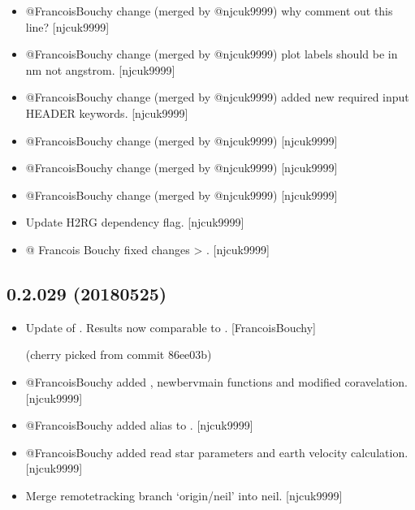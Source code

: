 \documentclass[a4paper,10pt,english]{report}
\begin{document}
\begin{itemize}
\begin{description}
\end{description}

\item {} 
@FrancoisBouchy change (merged by @njcuk9999) \sphinxhyphen{} why comment out this
line? {[}njcuk9999{]}

\item {} 
@FrancoisBouchy change (merged by @njcuk9999) \sphinxhyphen{} plot labels should be
in nm not angstrom. {[}njcuk9999{]}

\item {} 
@FrancoisBouchy change (merged by @njcuk9999) \sphinxhyphen{} added new required
input HEADER keywords. {[}njcuk9999{]}

\item {} 
@FrancoisBouchy change (merged by @njcuk9999) {[}njcuk9999{]}

\item {} 
@FrancoisBouchy change (merged by @njcuk9999) {[}njcuk9999{]}

\item {} 
@FrancoisBouchy change (merged by @njcuk9999) {[}njcuk9999{]}

\item {} 
Update H2RG dependency flag. {[}njcuk9999{]}

\item {} 
@ Francois Bouchy \sphinxhyphen{} fixed changes  \textendash{}\textgreater{} .
{[}njcuk9999{]}

\end{itemize}


\subsection{0.2.029 (2018\sphinxhyphen{}05\sphinxhyphen{}25)}
\label{\detokenize{misc/changelog:id449}}\begin{itemize}
\item {} 
Update of . Results now comparable to
. {[}FrancoisBouchy{]}

(cherry picked from commit 86ee03b)

\item {} 
@FrancoisBouchy added , newbervmain functions
and modified coravelation. {[}njcuk9999{]}

\item {} 
@FrancoisBouchy \sphinxhyphen{} added alias to .
{[}njcuk9999{]}

\item {} 
@FrancoisBouchy added read star parameters and earth velocity
calculation. {[}njcuk9999{]}

\item {} 
Merge remote\sphinxhyphen{}tracking branch ‘origin/neil’ into neil. {[}njcuk9999{]}

\end{itemize}
\end{document}
